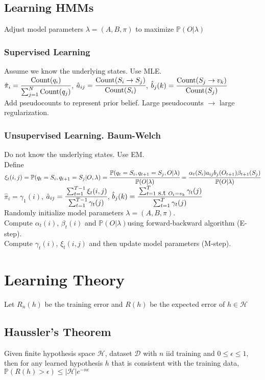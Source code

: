 \documentclass{article}
\renewcommand{\P}{\mathbb{P}}
\renewcommand{\H}{\mathcal{H}}
\newcommand{\D}{\mathcal{D}}
\begin{document}
\subsection{Learning HMMs}
Adjust model parameters $\lambda = (A, B, \pi)$ to maximize $\P(O | \lambda)$
\subsubsection{Supervised Learning}
Assume we know the underlying states. Use MLE. \\
$\hat{\pi}_i = \cfrac{\mbox{Count}(q_i)}{\sum_{j=1}^N \mbox{Count}(q_j)}$, $\hat{a}_{ij} = \cfrac{\mbox{Count}(S_i \to S_j)}{\mbox{Count}(S_i)}$, $\hat{b}_j(k) = \cfrac{\mbox{Count}(S_j \to v_k)}{\mbox{Count}(S_j)}$ \\
Add pseudocounts to represent prior belief. Large pseudocounts $\to$ large regularization.
\subsubsection{Unsupervised Learning. Baum-Welch}
Do not know the underlying states. Use EM. \\
Define $\xi_t(i,j) = \P(q_t = S_i, q_{t+1} = S_j | O, \lambda) = \cfrac{\P(q_t = S_i, q_{t+1} = S_j, O | \lambda)}{\P(O | \lambda)} = \cfrac{\alpha_t(S_i)a_{ij}b_j(O_{t+1})\beta_{t+1}(S_j)}{\P(O | \lambda)}$ \\
$\hat{\pi}_i = \gamma_1(i)$, $\hat{a}_{ij} = \cfrac{\sum_{t=1}^{T-1}\xi_t(i,j)}{\sum_{t=1}^{T-1}\gamma_t(j)}$, $\hat{b}_j(k) = \cfrac{\sum_{t=1 \mbox{ s.t } O_t = v_k}^{T} \gamma_t(j)}{\sum_{t=1}^{T}\gamma_t(j)}$ \\
Randomly initialize model parameters $\lambda = (A, B, \pi)$. \\
Compute $\alpha_t(i)$, $\beta_t(i)$ and $\P(O| \lambda) $using forward-backward algorithm (E-step). \\
Compute $\gamma_t(i)$, $\xi_t(i,j)$ and then update model parameters (M-step).

\section{Learning Theory}
Let $R_n(h)$ be the training error and $R(h)$ be the expected error of $h \in \H$ 
\subsection{Haussler's Theorem}
Given finite hypothesis space $\H$, dataset $\D$ with $n$ iid training and $0 \leq \epsilon \leq 1$, then for any learned hypothesis $h$ that is consistent with the training data, $\P(R(h) > \epsilon) \leq |\H| e ^{-n\epsilon}$
\end{document}
